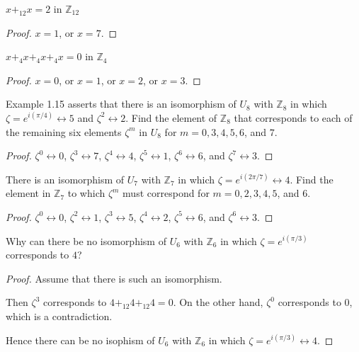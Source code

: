\begin{exercise}
    $x {+}_{12} x = 2$ in $\mathbb{Z}_{12}$
\end{exercise}

\begin{proof}
    $x = 1$, or $x = 7$.
\end{proof}

\begin{exercise}
    $x {+}_{4} x {+}_{4} x {+}_{4} x = 0$ in $\mathbb{Z}_{4}$
\end{exercise}

\begin{proof}
    $x = 0$, or $x = 1$, or $x = 2$, or $x = 3$.
\end{proof}

\begin{exercise}
    Example 1.15 asserts that there is an isomorphism of $U_{8}$ with $\mathbb{Z}_{8}$ in which $\zeta = e^{i(\pi/4)}\leftrightarrow 5$ and $\zeta^{2}\leftrightarrow 2$. Find the element of $\mathbb{Z}_{8}$ that corresponds to each of the remaining six elements $\zeta^{m}$ in $U_{8}$ for $m = 0, 3, 4, 5, 6$, and $7$.
\end{exercise}

\begin{proof}
    $\zeta^{0} \leftrightarrow 0$, $\zeta^{3} \leftrightarrow 7$, $\zeta^{4} \leftrightarrow 4$, $\zeta^{5}\leftrightarrow 1$, $\zeta^{6}\leftrightarrow 6$, and $\zeta^{7}\leftrightarrow 3$.
\end{proof}

\begin{exercise}
    There is an isomorphism of $U_{7}$ with $\mathbb{Z}_{7}$ in which $\zeta = e^{i(2\pi/7)}\leftrightarrow 4$. Find the element in $\mathbb{Z}_{7}$ to which $\zeta^{m}$ must correspond for $m = 0, 2, 3, 4, 5$, and $6$.
\end{exercise}

\begin{proof}
    $\zeta^{0} \leftrightarrow 0$, $\zeta^{2} \leftrightarrow 1$, $\zeta^{3} \leftrightarrow 5$, $\zeta^{4} \leftrightarrow 2$, $\zeta^{5} \leftrightarrow 6$, and $\zeta^{6} \leftrightarrow 3$.
\end{proof}

\begin{exercise}
    Why can there be no isomorphism of $U_{6}$ with $\mathbb{Z}_{6}$ in which $\zeta = e^{i(\pi/3)}$ corresponds to $4$?
\end{exercise}

\begin{proof}
    Assume that there is such an isomorphism.

    Then $\zeta^{3}$ corresponds to $4 {+}_{12} 4 {+}_{12} 4 = 0$. On the other hand, $\zeta^{0}$ corresponds to $0$, which is a contradiction.

    Hence there can be no isophism of $U_{6}$ with $\mathbb{Z}_{6}$ in which $\zeta = e^{i(\pi/3)}\leftrightarrow 4$.
\end{proof}

